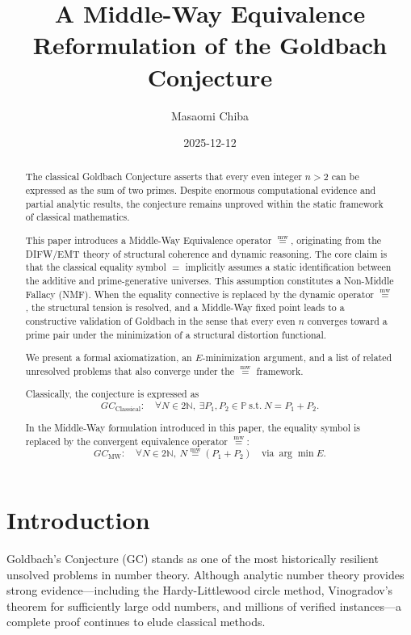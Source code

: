 \documentclass[12pt]{article}
\title{A Middle-Way Equivalence Reformulation of the Goldbach Conjecture}
\author{Masaomi Chiba}
\date{2025-12-12}
\newcommand{\mweq}{\mathrel{\overset{\mathrm{mw}}{=}}}
\theoremstyle{definition}
\theoremstyle{remark}
\begin{document}
\maketitle

\begin{abstract}
The classical Goldbach Conjecture asserts that every even integer 
$n > 2$ can be expressed as the sum of two primes. Despite enormous
computational evidence and partial analytic results, the conjecture
remains unproved within the static framework of classical mathematics.

This paper introduces a Middle-Way Equivalence operator $\mweq$,
originating from the DIFW/EMT theory of structural coherence and
dynamic reasoning. The core claim is that the classical equality
symbol $=$ implicitly assumes a static identification between the
additive and prime-generative universes. This assumption constitutes
a Non-Middle Fallacy (NMF). When the equality connective is replaced
by the dynamic operator $\mweq$, the structural tension is resolved,
and a Middle-Way fixed point leads to a constructive validation of
Goldbach in the sense that every even $n$ converges toward a prime
pair under the minimization of a structural distortion functional.

We present a formal axiomatization, an $E$-minimization argument,
and a list of related unresolved problems that also converge under
the $\mweq$ framework.

Classically, the conjecture is expressed as
\[
GC_{\text{Classical}}:
\quad \forall N \in 2\mathbb{N},\ 
\exists P_1, P_2 \in \mathbb{P}
\ \text{s.t.} \
N = P_1 + P_2.
\]

In the Middle-Way formulation introduced in this paper, the equality
symbol is replaced by the convergent equivalence operator $\mweq$:
\[
GC_{\text{MW}}:
\quad \forall N \in 2\mathbb{N},\
N \mweq (P_1 + P_2)
\quad \text{via} \ \arg\min E.
\]

\end{abstract}

\section{Introduction}

Goldbach's Conjecture (GC) stands as one of the most historically
resilient unsolved problems in number theory. Although analytic
number theory provides strong evidence---including the Hardy-Littlewood
circle method, Vinogradov's theorem for sufficiently large odd numbers,
and millions of verified instances---a complete proof continues
to elude classical methods.
\end{document}
